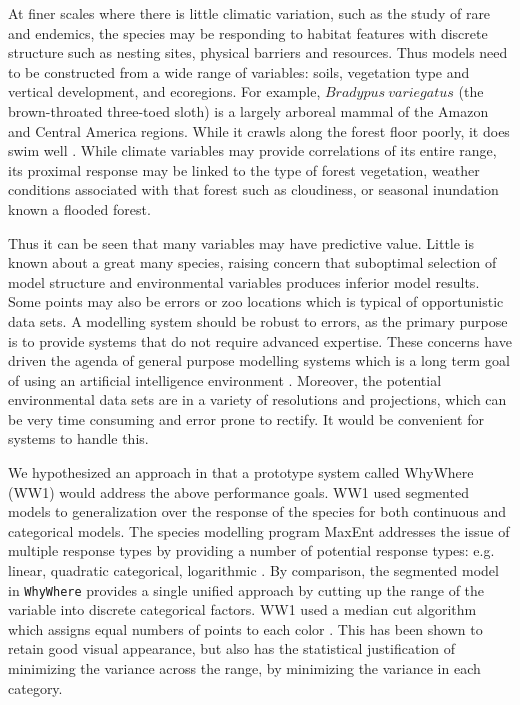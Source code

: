 \documentclass[10pt]{article}
\begin{document}
At finer scales where there is little climatic variation, such as the study of rare and endemics, the species may be responding to habitat features with discrete structure such as nesting sites, physical barriers and resources.  Thus models need to be constructed from a wide range of variables: soils, vegetation type and vertical development, and ecoregions. For example, $Bradypus~variegatus$ (the brown-throated three-toed sloth) is a largely arboreal mammal of the Amazon and Central America regions.  While it crawls along the forest floor poorly, it does swim well \cite{Hayssen2010}.  While climate variables may provide correlations of its entire range, its proximal response may be  linked to the type of forest vegetation, weather conditions associated with that forest such as cloudiness, or seasonal inundation known a flooded forest.  

Thus it can be seen that many variables may have predictive value.   Little is known about a great many species, raising concern that suboptimal selection of model structure and environmental variables produces inferior model results.  Some points may also be errors or zoo locations which is typical of opportunistic data sets. A modelling system should be robust to errors, as the primary purpose is to provide systems that do not require advanced expertise.  These concerns have driven the agenda of general purpose modelling systems which is a long term goal of using an artificial intelligence environment \cite{Davey:1991yg}.  Moreover, the potential environmental data sets are in a variety of resolutions and projections, which can be very time consuming and error prone to rectify. It would be convenient for systems to handle this.

We hypothesized an approach in \cite{Stockwell:2006xt, Stockwell:2006rf} that a prototype system called WhyWhere (WW1) would address the above performance goals.  WW1 used segmented models to generalization over the response of the species for both continuous and categorical models.  The species modelling program MaxEnt addresses the issue of multiple response types by providing a number of potential response types: e.g. linear, quadratic categorical, logarithmic \cite{Phillips2007}.  By comparison, the segmented model in \texttt{WhyWhere} provides a single unified approach by cutting up the range of the variable into discrete categorical factors.  WW1 \cite{Stockwell:2006xt} used a median cut algorithm which assigns equal numbers of points to each color \cite{Heckbert82}.  This has been shown to retain good visual appearance, but also has the statistical justification of minimizing the variance across the range, by minimizing the variance in each category.  
\end{document}
